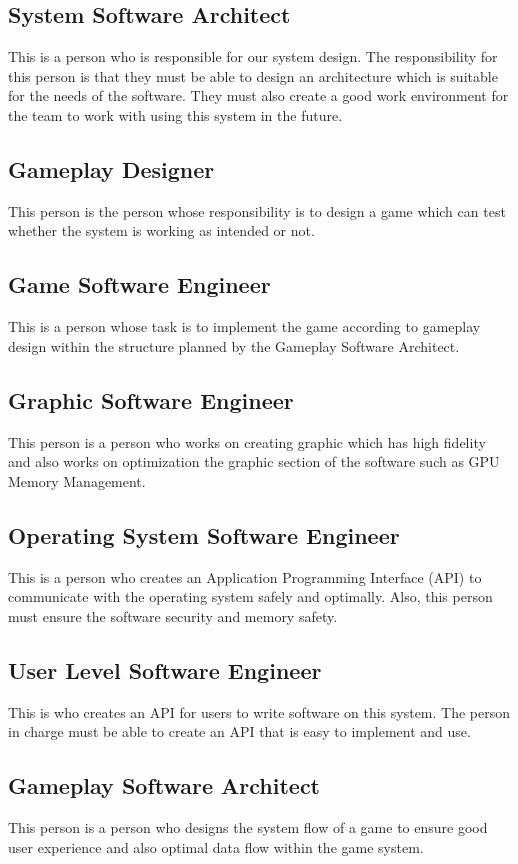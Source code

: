 \subsection*{System Software Architect}
This is a person who is responsible for our system design.
The responsibility for this person is that they must be able to design an architecture which is
suitable for the needs of the software.
They must also create a good work environment for the team to work
with using this system in the future.

\subsection*{Gameplay Designer}
This person is the person whose responsibility is to design a game which can test whether
the system is working as intended or not.

\subsection*{Game Software Engineer}
This is a person whose task is to implement the game according to gameplay design within the
structure planned by the Gameplay Software Architect.

\subsection*{Graphic Software Engineer}
This person is a person who works on creating graphic which has high fidelity and also works
on optimization the graphic section of the software such as GPU Memory Management.

\subsection*{Operating System Software Engineer}
This is a person who creates an Application Programming Interface (API) to communicate with
the operating system safely and optimally.
Also, this person must ensure the software security and memory safety.

\subsection*{User Level Software Engineer}
This is who creates an API for users to write software on this system.
The person in charge must be able to create an API that is easy to implement and use.

\subsection*{Gameplay Software Architect}
This person is a person who designs the system flow of a game to ensure good user experience
and also optimal data flow within the game system.

